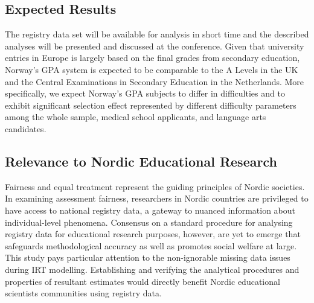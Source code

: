 \subsection{Expected Results}

The registry data set will be available for analysis in short time and the described analyses will be presented and discussed at the conference. Given that university entries in Europe is largely based on the final grades from secondary education, Norway's GPA system is expected to be comparable to the A Levels in the UK and the Central Examinations in Secondary Education in the Netherlands. More specifically, we expect Norway's GPA subjects to differ in difficulties \parencite[per report by][]{he:2018} and to exhibit significant selection effect \parencite[as demonstrated in][]{korobko:2008} represented by different difficulty parameters among the whole sample, medical school applicants, and language arts candidates.

\subsection{Relevance to Nordic Educational Research}

Fairness and equal treatment represent the guiding principles of Nordic societies. In examining assessment fairness, researchers in Nordic countries are privileged to have access to national registry data, a gateway to nuanced information about individual-level phenomena. Consensus on a standard procedure for analysing registry data for educational research purposes, however, are yet to emerge that safeguards methodological accuracy as well as promotes social welfare at large. This study pays particular attention to the non-ignorable missing data issues during IRT modelling. Establishing and verifying the analytical procedures and properties of resultant estimates would directly benefit Nordic educational scientists communities using registry data.

\printbibliography